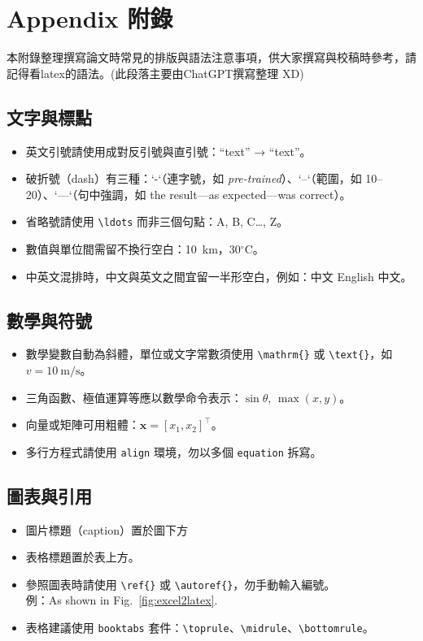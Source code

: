 \chapter{Appendix 附錄}
\label{ch:appendix}

本附錄整理撰寫論文時常見的排版與語法注意事項，供大家撰寫與校稿時參考，請記得看latex的語法。(此段落主要由ChatGPT撰寫整理 XD)

\section*{文字與標點}
\begin{itemize}
  \item 英文引號請使用成對反引號與直引號：``text'' → “text”。
  \item 破折號（dash）有三種：`-`（連字號，如 \textit{pre-trained}）、`--`（範圍，如 10--20）、`---`（句中強調，如 the result---as expected---was correct）。
  \item 省略號請使用 \verb|\ldots| 而非三個句點：A, B, C\ldots, Z。
  \item 數值與單位間需留不換行空白：10~km，30$^\circ$C。
  \item 中英文混排時，中文與英文之間宜留一半形空白，例如：中文 English 中文。
\end{itemize}

\section*{數學與符號}
\begin{itemize}
  \item 數學變數自動為斜體，單位或文字常數須使用 \verb|\mathrm{}| 或 \verb|\text{}|，如 $v=10~\mathrm{m/s}$。
  \item 三角函數、極值運算等應以數學命令表示：$\sin\theta$, $\max(x,y)$。
  \item 向量或矩陣可用粗體：$\mathbf{x}=[x_1,x_2]^\top$。
  \item 多行方程式請使用 \texttt{align} 環境，勿以多個 \texttt{equation} 拆寫。
\end{itemize}


\section*{圖表與引用}
\begin{itemize}
  \item 圖片標題（caption）置於圖下方
  \item 表格標題置於表上方。
  \item 參照圖表時請使用 \verb|\ref{}| 或 \verb|\autoref{}|，勿手動輸入編號。\\
        例：As shown in Fig.~\ref{fig:excel2latex}.
  \item 表格建議使用 \texttt{booktabs} 套件：\verb|\toprule|、\verb|\midrule|、\verb|\bottomrule|。
\end{itemize}

